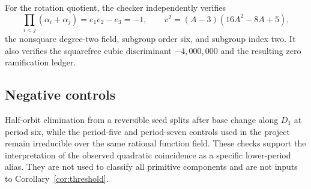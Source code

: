 For the rotation quotient, the checker independently verifies
\[
 \prod_{i<j}(\alpha_i+\alpha_j)=e_1e_2-e_3=-1,
 \qquad
 v^2=(A-3)(16A^2-8A+5),
\]
the nonsquare degree-two field, subgroup order six, and subgroup index two.
It also verifies the squarefree cubic discriminant
$-4{,}000{,}000$ and the resulting zero ramification ledger.

\subsection{Negative controls}

Half-orbit elimination from a reversible seed splits after base change along
$D_1$ at period six, while the period-five and period-seven controls used in
the project remain irreducible over the same rational function field.  These
checks support the interpretation of the observed quadratic coincidence as
a specific lower-period alias.  They are not used to classify all primitive
components and are not inputs to Corollary~\ref{cor:threshold}.
